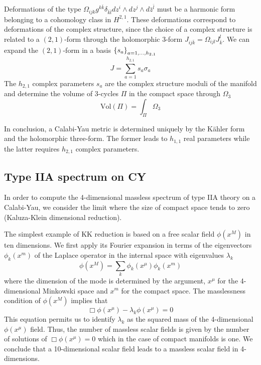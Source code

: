 Deformations of the type $\Omega_{ijk}g^{k\bar k}\delta_{\bar k\bar l}dz^i\wedge dz^j \wedge d\bar z^{\bar l}$ must be a harmonic form belonging to a cohomology class in $H^{2,1}$.
These deformations correspond to deformations of the complex structure, 
since the choice of a complex structure is related to a $(2,1)$-form through 
the holomorphic 3-form $J_{ij\bar k}= \Omega_{ijl}J^l_{\bar k}$.
We can expand the $(2,1)$-form in a basis $\qty{s_a}_{a=1,\ldots,h_{2,1}}$
\begin{equation}
J=\sum_{a=1}^{h_{2,1}}s_a \sigma_a
\end{equation}
The $h_{2,1}$ complex parameters $s_a$ are the complex structure moduli of the manifold
and determine the volume of 3-cycles $\Pi$ in the compact space through $\Omega_3$ 
\begin{equation}
  \mathrm{Vol}(\Pi)=\int_\Pi \Omega_3
\end{equation}

In conclusion, a Calabi-Yau metric is determined uniquely by the Kähler form and the holomorphic three-form.
The former leads to $h_{1,1}$ real parameters while the latter requires $h_{2,1}$ complex parameters.


\subsection{Type IIA spectrum on CY}
In order to compute the 4-dimensional massless spectrum of type IIA theory on a Calabi-Yau, we consider the 
limit where the size of compact space tends to zero (Kaluza-Klein dimensional reduction).

The simplest example of KK reduction is based on a free scalar field $\phi(x^M)$ in ten dimensions.
We first apply its Fourier expansion in terms of the eigenvectors $\phi_k(x^m)$ of the Laplace operator in the internal space  with eigenvalues $\lambda_k$
\begin{equation}
  \phi(x^M)= \sum_k \phi_k(x^\mu)\phi_k(x^m)
\end{equation}
where the dimension of the mode is determined by the argument, $x^\mu$ for the 4-dimensional Minkowski space and $x^m$ for the compact space.
The masslessness condition of $\phi(x^M)$ implies that
\begin{equation}
 \Box \phi(x^\mu) - \lambda_k \phi(x^\mu)=0 
\end{equation}
This equation permits us to identify $\lambda_k$  as the squared mass of the 4-dimensional $\phi(x^\mu)$ field.
Thus, the number of massless scalar fields is given by the number of solutions of $\Box \phi(x^\mu)=0$ which in the
case of compact manifolds is one.
We conclude that a 10-dimensional scalar field leads to a massless scalar field in 4-dimensions.


